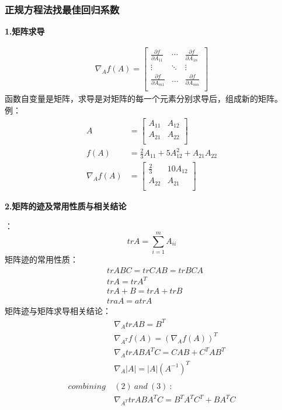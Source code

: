 \subsubsection{正规方程法找最佳回归系数}
\noindent\textbf{1.矩阵求导}\par
\begin{equation}\nonumber
\begin{split}
  \nabla_Af(A)=\left[\begin{array}{ccc}
\frac{\partial f}{\partial A_{11}}&\cdots&\frac{\partial f}{\partial A_{1n}}\\
\vdots&\ddots&\vdots\\
\frac{\partial f}{\partial A_{m1}}&\ldots&\frac{\partial f}{\partial A_{mn}}\\
\end{array}\right]
\end{split}
\end{equation}
函数自变量是矩阵，求导是对矩阵的每一个元素分别求导后，组成新的矩阵。\\
例：\\
\begin{equation}\nonumber
\begin{split}
 A &= \left[\begin{array}{cc}
    A_{11}&A_{12}\\
    A_{21}&A_{22}\\
              \end{array}\right]\\
f(A) &= \frac{2}{3} A_{11} +5 A_{12}^2 + A_{21}A_{22}\\
  \nabla_A f(A) &=\left[\begin{array}{cc}
  \frac{2}{3}&10A_{12}\\
  A_{22}&A_{21}\\
                        \end{array}\right]
\end{split}
\end{equation}

\noindent\textbf{2.矩阵的迹及常用性质与相关结论}\par
{}：\\
$$trA=\sum_{i=1}^{m}A_{ii}$$
矩阵迹的常用性质：\\
\begin{equation}\nonumber
\begin{split}
&trABC = trCAB = trBCA\\
&trA = trA^T\\
&trA+B = trA +trB\\
&traA=atrA
\end{split}
\end{equation}
矩阵迹与矩阵求导相关结论：\\
\begin{align}
&\nabla_A trAB = B^T\\
&\nabla_{A^T}f(A) = (\nabla_Af(A))^T\\
&\nabla_A trABA^TC = CAB+C^TAB^T\\
&\nabla_A|A| = |A|(A^{-1})^T\\
&~\nonumber\\
combining ~&(2)~ and~ (3)~ :\nonumber\\
&\nabla_{A^T}trABA^TC = B^TA^TC^T+BA^TC
\end{align}

